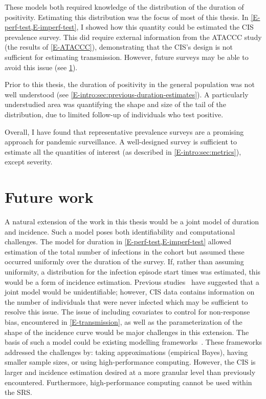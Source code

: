 \documentclass[thesis.tex]{subfiles}
\begin{document}
These models both required knowledge of the distribution of the duration of positivity.
Estimating this distribution was the focus of most of this thesis.
In \cref{E-perf-test,E-imperf-test}, I showed how this quantity could be estimated the CIS prevalence survey.
This did require external information from the ATACCC study (the results of \cref{E-ATACCC}), demonstrating that the CIS's design is not sufficient for estimating transmission.
However, future surveys may be able to avoid this issue (see \cref{conclusion:sec:future-work}).

Prior to this thesis, the duration of positivity in the general population was not well understood (see \cref{E-intro:sec:previous-duration-estimates}).
A particularly understudied area was quantifying the shape and size of the tail of the distribution, due to limited follow-up of individuals who test positive.

Overall, I have found that representative prevalence surveys are a promising approach for pandemic surveillance.
A well-designed survey is sufficient to estimate all the quantities of interest (as described in \cref{E-intro:sec:metrics}), except severity.


\section{Future work} \label{conclusion:sec:future-work}

A natural extension of the work in this thesis would be a joint model of duration and incidence.
Such a model poses both identifiability and computational challenges.
The model for duration in \cref{E-perf-test,E-imperf-test} allowed estimation of the total number of infections in the cohort but assumed these occurred uniformly over the duration of the survey.
If, rather than assuming uniformity, a distribution for the infection episode start times was estimated, this would be a form of incidence estimation.
Previous studies~\autocite[e.g.][]{bacchettiNonparametric} have suggested that a joint model would be unidentifiable; however, CIS data contains information on the number of individuals that were never infected which may be sufficient to resolve this issue.
The issue of including covariates to control for non-response bias, encountered in \cref{E-transmission}, as well as the parameterization of the shape of the incidence curve would be major challenges in this extension.
The basis of such a model could be existing modelling frameworks~\autocite[e.g.][]{taffeJoint,haySerosolver}.
These frameworks addressed the challenges by: taking approximations (\eg empirical Bayes), having smaller sample sizes, or using high-performance computing.
However, the CIS is larger and incidence estimation desired at a more granular level than previously encountered.
Furthermore, high-performance computing cannot be used within the SRS.
\end{document}
